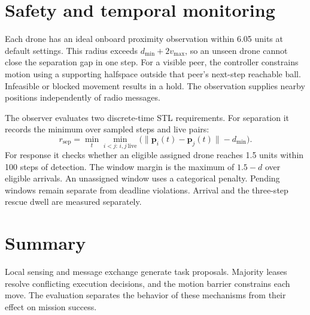 \section{Safety and temporal monitoring}
Each drone has an ideal onboard proximity observation within 6.05 units at default settings. This radius exceeds $d_{\min}+2v_{\max}$, so an unseen drone cannot close the separation gap in one step. For a visible peer, the controller constrains motion using a supporting halfspace outside that peer's next-step reachable ball. Infeasible or blocked movement results in a hold. The observation supplies nearby positions independently of radio messages.

The observer evaluates two discrete-time STL requirements. For separation it records the minimum over sampled steps and live pairs:
\begin{equation}
r_{\mathrm{sep}}=\min_{t}\min_{i<j:\,i,j\ \mathrm{live}}
  \bigl(\|\boldsymbol p_i(t)-\boldsymbol p_j(t)\|-d_{\min}\bigr).
\end{equation}
For response it checks whether an eligible assigned drone reaches 1.5 units within 100 steps of detection. The window margin is the maximum of $1.5-d$ over eligible arrivals. An unassigned window uses a categorical penalty. Pending windows remain separate from deadline violations. Arrival and the three-step rescue dwell are measured separately.

\section{Summary}
Local sensing and message exchange generate task proposals. Majority leases resolve conflicting execution decisions, and the motion barrier constrains each move. The evaluation separates the behavior of these mechanisms from their effect on mission success.
